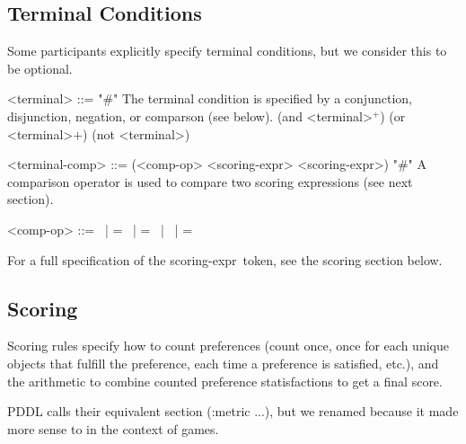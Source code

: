 \documentclass{article}
\begin{document}
\subsection{Terminal Conditions}
Some participants explicitly specify terminal conditions, but we consider this to be optional. 
        
\begin{grammar}
<terminal> ::= "#" The terminal condition is specified by a conjunction, disjunction, negation, or comparson (see below).
        \alt (and <terminal>$^+$)
        \alt (or <terminal>$+$)
        \alt (not <terminal>) 

<terminal-comp> ::= (<comp-op> <scoring-expr> <scoring-expr>) "#" A comparison operator is used to compare two scoring expressions (see next section).

    <comp-op> ::=  \textlangle \ | \textlangle = \ | = \ | \textrangle \ | \textrangle =



\end{grammar}
For a full specification of the \textlangle scoring-expr\textrangle\ token, see the scoring section below.
        


\subsection{Scoring}
Scoring rules specify how to count preferences (count once, once for each unique objects that fulfill the preference, each time a preference is satisfied, etc.), and the arithmetic to combine
        counted preference statisfactions to get a final score.
        
        PDDL calls their equivalent section (:metric ...), but we renamed because it made more sense to in the context of games. 
        
\end{document}
